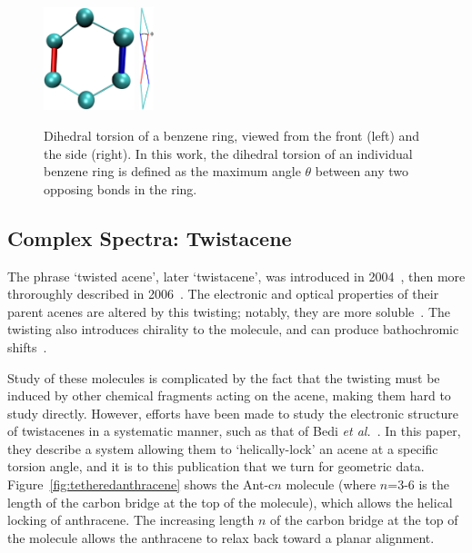 \documentclass[aip,reprint,nofootinbib]{revtex4-1}
\begin{document}
\begin{figure}
\begin{center}
\includegraphics[height=3cm]{dihedraldef}
\hspace{2cm}
\includegraphics[height=3cm]{thiccerdihedral}
\end{center}
\caption[Definition of dihedral torsion for benzene]{Dihedral torsion of a benzene ring, viewed from the front (left) and the side (right). In this work, the dihedral torsion of an individual benzene ring is defined as the maximum angle $\theta$ between any two opposing bonds in the ring.}\label{fig:distortiondef}
\end{figure}

\subsection{Complex Spectra: Twistacene}
\label{sec:twistacene}

The phrase `twisted acene', later `twistacene', was introduced in 2004~\cite{lu_2004}, then more throroughly described in 2006~\cite{pascal_2006}. The electronic and optical properties of their parent acenes are altered by this twisting; notably, they are more soluble~\cite{xiao2012synthesis}. The twisting also introduces chirality to the molecule, and can produce bathochromic shifts~\cite{bedi_2018}. 

Study of these molecules is complicated by the fact that the twisting must be induced by other chemical fragments acting on the acene, making them hard to study directly. However, efforts have been made to study the electronic structure of twistacenes in a systematic manner, such as that of Bedi \emph{et al.}~\cite{bedi_2018}. In this paper, they describe a system  allowing them to `helically-lock' an acene at a specific torsion angle, and it is to this publication that we turn for geometric data. Figure~\ref{fig:tetheredanthracene} shows the Ant-c$n$ molecule (where $n$=3-6 is the length of the carbon bridge at the top of the molecule), which allows the helical locking of anthracene. The increasing length $n$ of the carbon bridge at the top of the molecule allows the anthracene to relax back toward a planar alignment.
\end{document}
